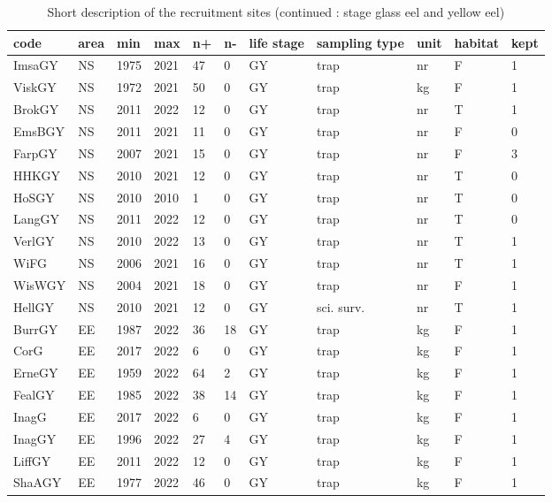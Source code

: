\begin{table}[htbp]
\centering
\caption{Short description of the recruitment sites (continued : stage glass eel and yellow eel)} 
\label{statseriesGY}
\begin{tabular}{p{1cm}p{1cm}p{1cm}p{1cm}p{0.8cm}p{0.8cm}p{1cm}p{2cm}p{2cm}p{1cm}p{1cm}}
  \hline
code & area & min & max & n+ & n- & life stage & sampling type & unit & habitat & kept \\ 
  \hline
ImsaGY & NS & 1975 & 2021 & 47 & 0 & GY & trap & nr & F & 1 \\ 
  ViskGY & NS & 1972 & 2021 & 50 & 0 & GY & trap & kg & F & 1 \\ 
  BrokGY & NS & 2011 & 2022 & 12 & 0 & GY & trap & nr & T & 1 \\ 
  EmsBGY & NS & 2011 & 2021 & 11 & 0 & GY & trap & nr & F & 0 \\ 
  FarpGY & NS & 2007 & 2021 & 15 & 0 & GY & trap & nr & F & 3 \\ 
  HHKGY & NS & 2010 & 2021 & 12 & 0 & GY & trap & nr & T & 0 \\ 
  HoSGY & NS & 2010 & 2010 & 1 & 0 & GY & trap & nr & T & 0 \\ 
  LangGY & NS & 2011 & 2022 & 12 & 0 & GY & trap & nr & T & 0 \\ 
  VerlGY & NS & 2010 & 2022 & 13 & 0 & GY & trap & nr & T & 1 \\ 
  WiFG & NS & 2006 & 2021 & 16 & 0 & GY & trap & nr & T & 1 \\ 
  WisWGY & NS & 2004 & 2021 & 18 & 0 & GY & trap & nr & F & 1 \\ 
  HellGY & NS & 2010 & 2021 & 12 & 0 & GY & sci. surv. & nr & T & 1 \\ 
  BurrGY & EE & 1987 & 2022 & 36 & 18 & GY & trap & kg & F & 1 \\ 
  CorG & EE & 2017 & 2022 & 6 & 0 & GY & trap & kg & F & 1 \\ 
  ErneGY & EE & 1959 & 2022 & 64 & 2 & GY & trap & kg & F & 1 \\ 
  FealGY & EE & 1985 & 2022 & 38 & 14 & GY & trap & kg & F & 1 \\ 
  InagG & EE & 2017 & 2022 & 6 & 0 & GY & trap & kg & F & 1 \\ 
  InagGY & EE & 1996 & 2022 & 27 & 4 & GY & trap & kg & F & 1 \\ 
  LiffGY & EE & 2011 & 2022 & 12 & 0 & GY & trap & kg & F & 1 \\ 
  ShaAGY & EE & 1977 & 2022 & 46 & 0 & GY & trap & kg & F & 1 \\ 

\end{tabular}
\end{table}
